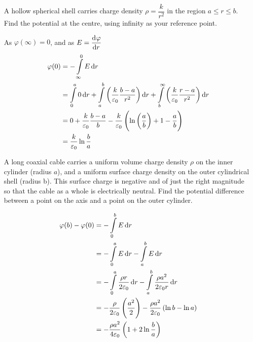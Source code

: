\documentclass[fleqn, a4paper, 10pt, oneside]{scrartcl}
\theoremstyle{definition}
\theoremstyle{theorem}
\begin{document}
\begin{question}
	A hollow spherical shell carries charge density $\rho = \dfrac{k}{r^2}$ in the region $a \le r \le b$.
	Find the potential at the centre, using infinity as your reference point.
	\begin{figure}[H]
	\end{figure}
\end{question}

\begin{solution}
	As $\varphi(\infty) = 0$, and as $E = \dod{\varphi}{r}$
	\begin{align*}
		\varphi(0) &= -\int\limits_{\infty}^{0} E \dif r\\
		&= \int\limits_{0}^{a} 0 \dif r + \int\limits_{a}^{b} \left( \dfrac{k}{\varepsilon_0} \dfrac{b - a}{r^2} \right) \dif r + \int\limits_{b}^{\infty} \left( \dfrac{k}{\varepsilon_0} \dfrac{r - a}{r^2} \right) \dif r\\
		&= 0 + \dfrac{k}{\varepsilon_0} \dfrac{b - a}{b} - \dfrac{k}{\varepsilon_0} \left( \ln \left( \dfrac{a}{b} \right) + 1 - \dfrac{a}{b} \right)\\
		&= \dfrac{k}{\varepsilon_0} \ln \dfrac{b}{a}
	\end{align*}
\end{solution}

\begin{question}
	A long coaxial cable carries a uniform volume charge density $\rho$ on the inner cylinder (radius $a$), and a uniform surface charge density on the outer cylindrical shell (radius b).
	This surface charge is negative and of just the right magnitude so that the cable as a whole is electrically neutral.
	Find the potential difference between a point on the axis and a point on the outer cylinder.
\end{question}

\begin{solution}
	\begin{align*}
		\varphi(b) - \varphi(0) &= -\int\limits_{0}^{b} E \dif r\\
		&= -\int\limits_{0}^{a} E \dif r - \int\limits_{a}^{b} E \dif r\\
		&= -\int\limits_{0}^{a} \dfrac{\rho r}{2 \varepsilon_0} \dif r - \int\limits_{a}^{b} \dfrac{\rho a^2}{2 \varepsilon_0 r} \dif r\\
		&= -\dfrac{\rho}{2 \varepsilon_0} \left( \dfrac{a^2}{2} \right) - \dfrac{\rho a^2}{2 \varepsilon_0} \left( \ln b - \ln a \right)\\
		&= -\dfrac{\rho a^2}{4 \varepsilon_0} \left( 1 + 2 \ln \dfrac{b}{a} \right)
	\end{align*}
\end{solution}
\end{document}
